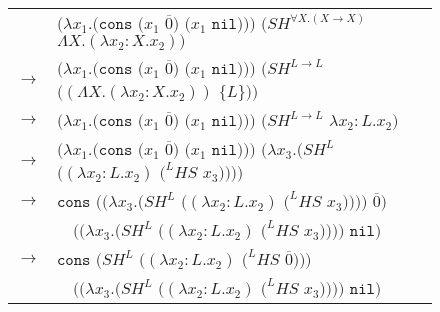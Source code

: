 \begin{figure}[tb]
\centering
\begin{tabular}{ll}
\vspace{5pt}

& $(\lambda x_{1}.(\mathtt{cons}$ $(x_{1}$ $\overline{0})$ $(x_{1}$ $\mathtt{nil})))$ $(SH^{\forall X.(X\rightarrow X)}$ $\Lambda X.(\lambda x_{2}:X.x_{2}))$ \\

\vspace{5pt}

$\rightarrow$ & $(\lambda x_{1}.(\mathtt{cons}$ $(x_{1}$ $\overline{0})$ $(x_{1}$ $\mathtt{nil})))$ $(SH^{L\rightarrow L}$ $((\Lambda X.(\lambda x_{2}:X.x_{2}))$ $\lbrace L\rbrace))$ \\

\vspace{5pt}

$\rightarrow$ & $(\lambda x_{1}.(\mathtt{cons}$ $(x_{1}$ $\overline{0})$ $(x_{1}$ $\mathtt{nil})))$ $(SH^{L\rightarrow L}$ $\lambda x_{2}:L.x_{2})$ \\

\vspace{5pt}

$\rightarrow$ & $(\lambda x_{1}.(\mathtt{cons}$ $(x_{1}$ $\overline{0})$ $(x_{1}$ $\mathtt{nil})))$ $(\lambda x_{3}.(SH^{L}$ $((\lambda x_{2}:L.x_{2})$
$(^{L}HS$ $x_{3}))))$ \\

\vspace{5pt}

$\rightarrow$ & $\mathtt{cons}$ $((\lambda x_{3}.(SH^{L}$ $((\lambda x_{2}:L.x_{2})$ $(^{L}HS$ $x_{3}))))$ $\overline{0})$ \\

\vspace{5pt}

& $\quad((\lambda x_{3}.(SH^{L}$ $((\lambda x_{2}:L.x_{2})$ $(^{L}HS$ $x_{3}))))$ $\mathtt{nil})$ \\

\vspace{5pt}

$\rightarrow$ & $\mathtt{cons}$ $(SH^{L}$ $((\lambda x_{2}:L.x_{2})$ $(^{L}HS$ $\overline{0})))$ \\

\vspace{5pt}

& $\quad((\lambda x_{3}.(SH^{L}$ $((\lambda x_{2}:L.x_{2})$ $(^{L}HS$ $x_{3}))))$ $\mathtt{nil})$ \\


\end{tabular}
\end{figure}
